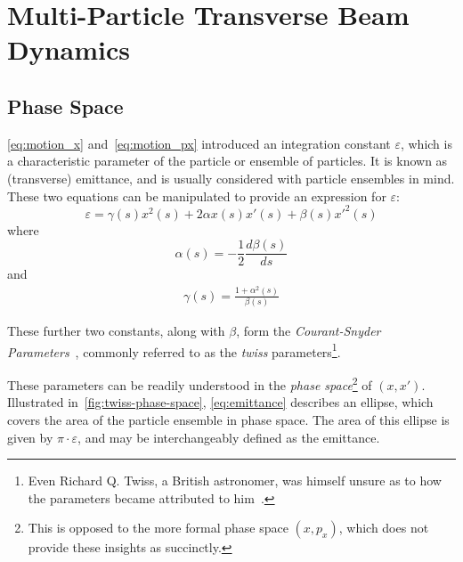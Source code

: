 \documentclass[11pt]{report}
\begin{document}
\clearpage

\section{Multi-Particle Transverse Beam Dynamics}\label{sec:theory-transverse}

\subsection{Phase Space}\label{subsec:trans_phase_space}

\autoref{eq:motion_x} and~\autoref{eq:motion_px} introduced an integration constant $\varepsilon$, which is a characteristic parameter of the particle or ensemble of particles. It is known as (transverse) emittance, and is usually considered with particle ensembles in mind. These two equations can be manipulated to provide an expression for $\varepsilon$:
\begin{equation}
  \varepsilon = \gamma(s)x^2(s)+2\alpha x(s)x'(s)+\beta(s)x'^2(s)
  \label{eq:emittance}
\end{equation} where 
\begin{equation}
  \alpha(s) = -\frac12\frac{d\beta(s)}{ds}
  \label{eq:alpha}
\end{equation} and
\begin{eqnarray}
  \gamma(s) = \frac{1+\alpha^2(s)}{\beta(s)}
  \label{eq:gamma}
\end{eqnarray}

These further two constants, along with $\beta$, form the \textit{Courant-Snyder Parameters}~\cite{courantsnyder}, commonly referred to as the \textit{twiss} parameters\footnote{Even Richard Q. Twiss, a British astronomer, was himself unsure as to how the parameters became attributed to him~\cite{richardtwiss}.}. 

These parameters can be readily understood in the \textit{phase space}\footnote{This is opposed to the more formal phase space $(x, p_x)$, which does not provide these insights as succinctly.} of $(x, x')$. Illustrated in~\autoref{fig:twiss-phase-space}, \autoref{eq:emittance} describes an ellipse, which covers the area of the particle ensemble in phase space. The area of this ellipse is given by $\pi\cdot\varepsilon$, and may be interchangeably defined as the emittance. 
\end{document}
